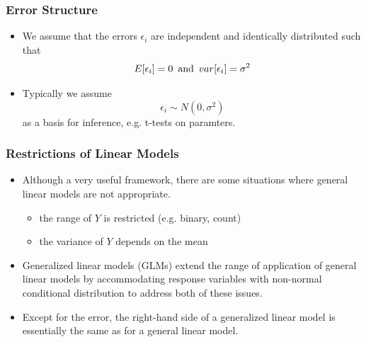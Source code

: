 \documentclass[10pt,xcolor={svgnames},t]{beamer}
\begin{document}
%
%
\begin{frame}
	\frametitle{Error Structure}
	
	\begin{itemize}
		\item We assume that the errors $\epsilon_i$ are independent and identically distributed such that
		\[ E[\epsilon_i]=0 \hskip5pt
		\text{and} 
		\hskip5pt var[\epsilon_i]=\sigma^2
		\]
		\bigskip
		\item Typically we assume 
		\[
		\epsilon_i \sim N(0 , \sigma^2 )
		\]
		as a basis for inference, e.g. t-tests on paramters.
	\end{itemize}
	
	
\end{frame}
%
%
%
\begin{frame}
	\frametitle{Restrictions of Linear Models}
	
	\begin{itemize}
		\item Although a very useful framework, there are some situations where general linear models are not appropriate.
		\begin{itemize}
			\item the range of $Y$ is restricted (e.g. binary, count)
			\item the variance of $Y$ depends on the mean
		\end{itemize}
		\bigskip
		\item Generalized linear models (GLMs) extend the range of application of general linear models by accommodating response variables with non-normal conditional distribution to address both of these issues.
		\bigskip
		\item Except for the error, the right-hand side of a generalized linear model is essentially the same as for a general linear model.
	\end{itemize}
	
	
\end{frame}
%
\end{document}
